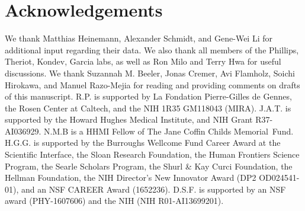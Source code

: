 \section{Acknowledgements}
We thank Matthias Heinemann, Alexander Schmidt, and Gene-Wei Li for additional
input regarding their data. We also thank all members of the Phillips, Theriot,
Kondev, Garcia labs, as well as Ron Milo and Terry Hwa for useful discussions.
We thank Suzannah M. Beeler, Jonas Cremer, Avi Flamholz, Soichi Hirokawa, and Manuel
Razo-Mejia for reading and providing comments on drafts of this manuscript. R.P.
is supported by La Fondation Pierre-Gilles de Gennes, the Rosen Center at
Caltech, and the NIH 1R35 GM118043 (MIRA). J.A.T. is supported by the Howard
Hughes Medical Institute, and NIH Grant R37-AI036929. N.M.B is a HHMI Fellow of
The Jane Coffin Childs Memorial Fund. H.G.G. is supported by the Burroughs
Wellcome Fund Career Award at the Scientific Interface, the Sloan Research
Foundation, the Human Frontiers Science Program, the Searle Scholars Program,
the Shurl \& Kay Curci Foundation, the Hellman Foundation, the NIH Director’s
New Innovator Award (DP2 OD024541-01), and an NSF CAREER Award (1652236). D.S.F.
is supported by an NSF award (PHY-1607606) and the NIH (NIH R01-AI13699201).
